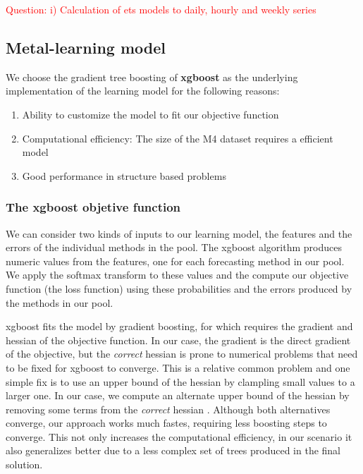 \documentclass[11pt,a4paper,]{article}
\providecommand{\tightlist}{%
  \setlength{\itemsep}{0pt}\setlength{\parskip}{0pt}}
\theoremstyle{definition}
\theoremstyle{definition}
\theoremstyle{definition}
\theoremstyle{remark}
\begin{document}
\textcolor{red}{Question: i) Calculation of ets models to daily, hourly and weekly series}

\subsection{Metal-learning model}\label{metal-learning-model}

We choose the gradient tree boosting of \textbf{xgboost} as the
underlying implementation of the learning model for the following
reasons:

\begin{enumerate}
\def\labelenumi{\arabic{enumi}.}
\tightlist
\item
  Ability to customize the model to fit our objective function
\item
  Computational efficiency: The size of the M4 dataset requires a
  efficient model
\item
  Good performance in structure based problems
\end{enumerate}

\subsubsection{The xgboost objetive
function}\label{the-xgboost-objetive-function}

We can consider two kinds of inputs to our learning model, the features
and the errors of the individual methods in the pool. The xgboost
algorithm produces numeric values from the features, one for each
forecasting method in our pool. We apply the softmax transform to these
values and the compute our objective function (the loss function) using
these probabilities and the errors produced by the methods in our pool.

xgboost fits the model by gradient boosting, for which requires the
gradient and hessian of the objective function. In our case, the
gradient is the direct gradient of the objective, but the \emph{correct}
hessian is prone to numerical problems that need to be fixed for xgboost
to converge. This is a relative common problem and one simple fix is to
use an upper bound of the hessian by clampling small values to a larger
one. In our case, we compute an alternate upper bound of the hessian by
removing some terms from the \emph{correct} hessian . Although both
alternatives converge, our approach works much fastes, requiring less
boosting steps to converge. This not only increases the computational
efficiency, in our scenario it also generalizes better due to a less
complex set of trees produced in the final solution.
\end{document}
